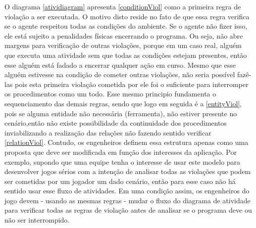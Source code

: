 O diagrama \ref{atividiagram} apresenta \ref{conditionViol} como a primeira regra de violação a ser executada. O motivo disto reside no fato de que essa regra verifica se o agente respeitou todas as condições do ambiente. Se o agente não fizer isso, ele está sujeito a penalidades físicas encerrando o programa. Ou seja, não abre margens para verificação de outras violações, porque em um caso real, alguém que executa uma atividade sem que todas as condições estejam presentes, então esse alguém está fadado a encerrar qualquer ação em curso. Mesmo que esse alguém estivesse na condição de cometer outras violações, não seria possível fazê-las pois esta primeira violação cometida por ele foi o suficiente para interromper os procedimentos como um todo. Esse mesmo principio fundamenta o sequenciamento das demais regras, sendo que logo em seguida é a \ref{entityViol}, pois se alguma entidade não necessária (ferramenta), não estiver presente no cenário,então não existe possibilidade da continuidade dos procedimentos inviabilizando a realização das relações não fazendo sentido verificar \ref{relationViol}. Contudo, os engenheiros definem essa estrutura apenas como uma proposta que deve ser modificada em função dos interesses da aplicação. Por exemplo, supondo que uma equipe tenha o interesse de usar este modelo para desenvolver jogos sérios com a intenção de analisar todas as violações que podem ser cometidas por um jogador um dado cenário, então para esse caso não há sentido usar esse fluxo de atividades. Em uma condição assim, os engenheiros do jogo devem - usando as mesmas regras - mudar o fluxo do diagrama de atividade para verificar todas as regras de violação antes de analisar se o programa deve ou não ser interrompido.